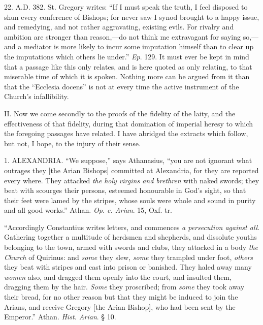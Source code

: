 22. A.D.
382. St. Gregory writes: ``If I must speak the truth, I feel disposed to
shun every conference of Bishops; for never saw I synod brought to a
happy issue, and remedying, and not rather aggravating, existing evils.
For rivalry and ambition are stronger than reason,—do not think me
extravagant for saying so,—and a mediator is more likely to incur some
imputation himself than to clear up the imputations which others lie
under.'' \emph{Ep}. 129. It must ever be kept in mind that a passage like
this only relates, and is here quoted as only relating, to that
miserable time of which it is spoken. Nothing more can be argued from it
than that the ``Ecclesia docens'' is not at every time the active
instrument of the Church's infallibility.

II. Now we come secondly to the proofs of the fidelity of the laity, and
the effectiveness of that fidelity, during that domination of imperial
heresy to which the foregoing passages have related. I have abridged the
extracts which follow, but not, I hope, to the injury of their sense.

1. ALEXANDRIA.
``We suppose,'' says Athanasius, ``you are not ignorant what outrages they
[the Arian Bishops] committed at Alexandria, for they are reported every
where. They attacked \emph{the holy virgins and brethren} with naked
swords; they beat with scourges their persons, esteemed honourable in
God's sight, so that their feet were lamed by the stripes, whose souls
were whole and sound in purity and all good works.'' Athan. \emph{Op. c.
Arian}. 15, Oxf. tr.

``Accordingly Constantius writes letters, and
commences \emph{a persecution against all}. Gathering together a
multitude of herdsmen and shepherds, and dissolute youths belonging to
the town, armed with swords and clubs, they attacked in a body \emph{the
Church} of Quirinus: and \emph{some} they slew, \emph{some} they
trampled under foot, \emph{others} they beat with stripes and cast into
prison or banished. They haled away many \emph{women} also, and dragged
them openly into the court, and insulted them, dragging them by the
hair. \emph{Some} they proscribed; from \emph{some} they took away their
bread, for no other reason but that they might be induced to join the
Arians, and receive Gregory [the Arian Bishop], who had been sent by the
Emperor.'' Athan. \emph{Hist. Arian}. § 10.

